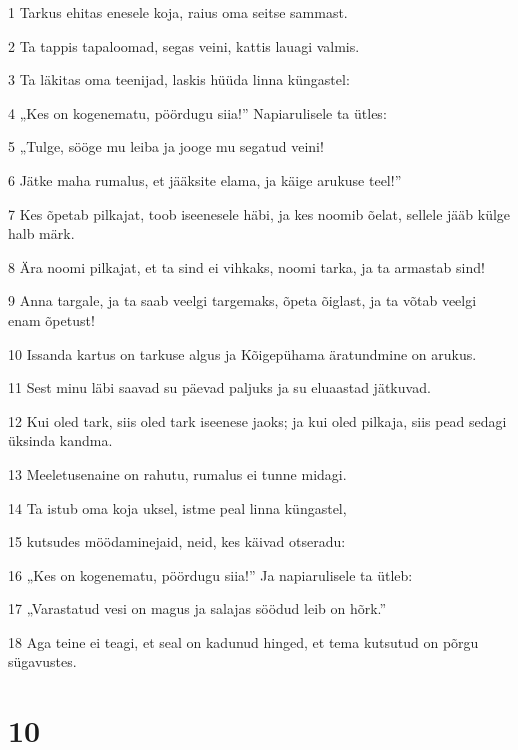 \par 1 Tarkus ehitas enesele koja, raius oma seitse sammast.
\par 2 Ta tappis tapaloomad, segas veini, kattis lauagi valmis.
\par 3 Ta läkitas oma teenijad, laskis hüüda linna küngastel:
\par 4 „Kes on kogenematu, pöördugu siia!” Napiarulisele ta ütles:
\par 5 „Tulge, sööge mu leiba ja jooge mu segatud veini!
\par 6 Jätke maha rumalus, et jääksite elama, ja käige arukuse teel!”
\par 7 Kes õpetab pilkajat, toob iseenesele häbi, ja kes noomib õelat, sellele jääb külge halb märk.
\par 8 Ära noomi pilkajat, et ta sind ei vihkaks, noomi tarka, ja ta armastab sind!
\par 9 Anna targale, ja ta saab veelgi targemaks, õpeta õiglast, ja ta võtab veelgi enam õpetust!
\par 10 Issanda kartus on tarkuse algus ja Kõigepühama äratundmine on arukus.
\par 11 Sest minu läbi saavad su päevad paljuks ja su eluaastad jätkuvad.
\par 12 Kui oled tark, siis oled tark iseenese jaoks; ja kui oled pilkaja, siis pead sedagi üksinda kandma.
\par 13 Meeletusenaine on rahutu, rumalus ei tunne midagi.
\par 14 Ta istub oma koja uksel, istme peal linna küngastel,
\par 15 kutsudes möödaminejaid, neid, kes käivad otseradu:
\par 16 „Kes on kogenematu, pöördugu siia!” Ja napiarulisele ta ütleb:
\par 17 „Varastatud vesi on magus ja salajas söödud leib on hõrk.”
\par 18 Aga teine ei teagi, et seal on kadunud hinged, et tema kutsutud on põrgu sügavustes.

\chapter{10}

